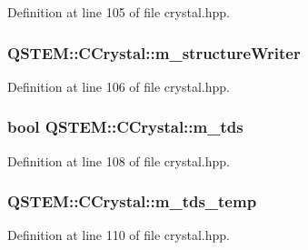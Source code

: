 Definition at line 105 of file crystal.\-hpp.

\hypertarget{class_q_s_t_e_m_1_1_c_crystal_a002d361cc0cf2df32145b4f47bc1548c}{
\subsubsection[{m\-\_\-structure\-Writer}]{ Q\-S\-T\-E\-M\-::\-C\-Crystal\-::m\-\_\-structure\-Writer\hspace{0.3cm}{\ttfamily [protected]}}}\label{class_q_s_t_e_m_1_1_c_crystal_a002d361cc0cf2df32145b4f47bc1548c}


Definition at line 106 of file crystal.\-hpp.

\hypertarget{class_q_s_t_e_m_1_1_c_crystal_a6e6f76b2a4627cc786c2ecfd4589b72b}{
\subsubsection[{m\-\_\-tds}]{\setlength{\rightskip}{0pt plus 5cm}bool Q\-S\-T\-E\-M\-::\-C\-Crystal\-::m\-\_\-tds\hspace{0.3cm}{\ttfamily [protected]}}}\label{class_q_s_t_e_m_1_1_c_crystal_a6e6f76b2a4627cc786c2ecfd4589b72b}


Definition at line 108 of file crystal.\-hpp.

\hypertarget{class_q_s_t_e_m_1_1_c_crystal_ace340582c3c31d77144b8e7e4354321b}{
\subsubsection[{m\-\_\-tds\-\_\-temp}]{ Q\-S\-T\-E\-M\-::\-C\-Crystal\-::m\-\_\-tds\-\_\-temp\hspace{0.3cm}{\ttfamily [protected]}}}\label{class_q_s_t_e_m_1_1_c_crystal_ace340582c3c31d77144b8e7e4354321b}


Definition at line 110 of file crystal.\-hpp.

